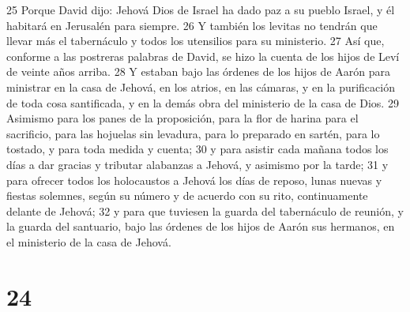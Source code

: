 25 Porque David dijo: Jehová Dios de Israel ha dado paz a su pueblo Israel, y él habitará en Jerusalén para siempre.
26 Y también los levitas no tendrán que llevar más el tabernáculo y todos los utensilios para su ministerio. 
27 Así que, conforme a las postreras palabras de David, se hizo la cuenta de los hijos de Leví de veinte años arriba.
28 Y estaban bajo las órdenes de los hijos de Aarón para ministrar en la casa de Jehová, en los atrios, en las cámaras, y en la purificación de toda cosa santificada, y en la demás obra del ministerio de la casa de Dios.
29 Asimismo para los panes de la proposición, para la flor de harina para el sacrificio, para las hojuelas sin levadura, para lo preparado en sartén, para lo tostado, y para toda medida y cuenta;
30 y para asistir cada mañana todos los días a dar gracias y tributar alabanzas a Jehová, y asimismo por la tarde;
31 y para ofrecer todos los holocaustos a Jehová los días de reposo, lunas nuevas y fiestas solemnes, según su número y de acuerdo con su rito, continuamente delante de Jehová;
32 y para que tuviesen la guarda del tabernáculo de reunión, y la guarda del santuario, bajo las órdenes de los hijos de Aarón sus hermanos, en el ministerio de la casa de Jehová. 

\chapter{24}

